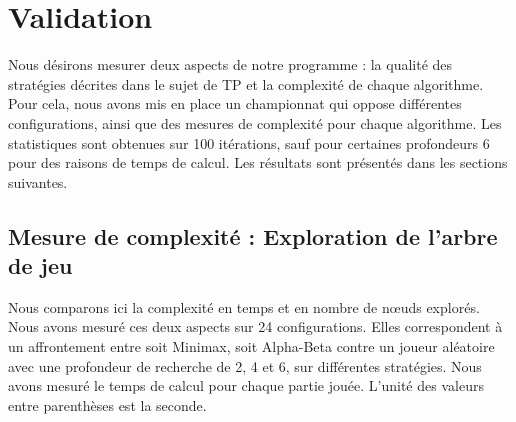 \chapter{Validation}
\label{ch:validation}
Nous désirons mesurer deux aspects de notre programme : la qualité des stratégies décrites dans le sujet de \ac{TP} et la complexité de chaque algorithme. Pour cela, nous avons mis en place un championnat qui oppose différentes configurations, ainsi que des mesures de complexité pour chaque algorithme. Les statistiques sont obtenues sur 100 itérations, sauf pour certaines profondeurs 6 pour des raisons de temps de calcul. Les résultats sont présentés dans les sections suivantes.


\section{Mesure de complexité : Exploration de l'arbre de jeu}
\label{sec:game_tree_exploration}
Nous comparons ici la complexité en temps et en nombre de nœuds explorés. Nous avons mesuré ces deux aspects sur 24 configurations. Elles correspondent à un affrontement entre soit Minimax, soit Alpha-Beta contre un joueur aléatoire avec une profondeur de recherche de 2, 4 et 6, sur différentes stratégies. Nous avons mesuré le temps de calcul pour chaque partie jouée. L'unité des valeurs entre parenthèses est la seconde.


